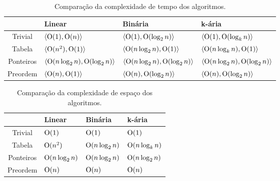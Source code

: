\begin{table}[]
  \begin{tabular}{|c|l|l|l|}
  \hline
            & Linear                                       & Binária                                      & k-ária                                       \\ \hline
  Trivial   & $\langle \mathrm{O}(1), \mathrm{O}(n) \rangle$                 & $\langle \mathrm{O}(1), \mathrm{O}(\log_2 n) \rangle$          & $\langle \mathrm{O}(1), \mathrm{O}(\log_k n) \rangle$          \\ \hline
  Tabela    & $\langle \mathrm{O}(n^2), \mathrm{O}(1) \rangle$               & $\langle \mathrm{O}(n \log_2 n), \mathrm{O}(1) \rangle$        & $\langle \mathrm{O}(n \log_k n), \mathrm{O}(1) \rangle$        \\ \hline
  Ponteiros & $\langle \mathrm{O}(n \log_2 n), \mathrm{O}(\log_2 n) \rangle$ & $\langle \mathrm{O}(n \log_2 n), \mathrm{O}(\log_2 n) \rangle$ & $\langle \mathrm{O}(n \log_2 n), \mathrm{O}(\log_2 n) \rangle$ \\ \hline
  Preordem  & $\langle \mathrm{O}(n), \mathrm{O}(1) \rangle$                 & $\langle \mathrm{O}(n), \mathrm{O}(\log_2 n) \rangle$          & $\langle \mathrm{O}(n), \mathrm{O}(\log_2 n) \rangle$          \\ \hline
  \end{tabular}
  \caption{Comparação da complexidade de tempo dos algoritmos.\label{tab:complexidadetempo}}
  \end{table}

  \begin{table}[]
    \begin{tabular}{|c|l|l|l|}
    \hline
              & Linear              & Binária             & k-ária              \\ \hline
    Trivial   & $\mathrm{O}(1)$          & $\mathrm{O}(1)$              & $\mathrm{O}(1)$              \\ \hline
    Tabela    & $\mathrm{O}(n^2)$        & $\mathrm{O}(n \log_2 n)$     & $\mathrm{O}(n \log_k n)$ \\ \hline
    Ponteiros & $\mathrm{O}(n \log_2 n)$ & $\mathrm{O}(n \log_2 n)$ & $\mathrm{O}(n \log_2 n)$ \\ \hline
    Preordem  & $\mathrm{O}(n)$          & $\mathrm{O}(n)$          & $\mathrm{O}(n)$          \\ \hline
    \end{tabular}
    \caption{Comparação da complexidade de espaço dos algoritmos.\label{tab:complexidadeespaco}}
    \end{table}
